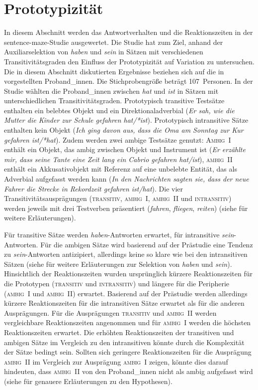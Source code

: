 \section{Prototypizität}
\label{ergprot}

In diesem Abschnitt werden das Antwortverhalten und die Reaktionszeiten in der sentence-maze-Studie ausgewertet. Die Studie hat zum Ziel, anhand der Auxiliarselektion von \textit{haben} und \textit{sein} in Sätzen mit verschiedenen Transitivitätsgraden den Einfluss der Prototypizität auf Varia\-tion zu untersuchen. Die in diesem Abschnitt diskutierten Ergebnisse beziehen sich auf die in  vorgestellten Proband\_innen. Die Stichprobengröße beträgt 107~Personen. In der Studie wählten die Proband\_innen zwischen \textit{hat} und \textit{ist} in Sätzen mit unterschiedlichen Transitivitätsgraden. Prototypisch transitive Testsätze enthalten ein belebtes Objekt und ein Direktionaladverbial (\textit{Er sah, wie die Mutter die Kinder zur Schule gefahren hat/*ist}). Prototypisch intransitive Sätze enthalten kein Objekt (\textit{Ich ging davon aus, dass die Oma am Sonntag zur Kur gefahren ist/*hat}). Zudem werden zwei ambige Testsätze genutzt: \textsc{Ambig~I} enthält ein Objekt, das ambig zwischen Objekt und Instrument ist (\textit{Er erzählte mir, dass seine Tante eine Zeit lang ein Cabrio gefahren hat/ist}), \textsc{ambig~II} enthält ein Akkusativobjekt mit Referenz auf eine unbelebte Entität, das als Adverbial aufgefasst werden kann (\textit{In den Nachrichten sagten sie, dass der neue Fahrer die Strecke in Rekordzeit gefahren ist/hat}). Die vier Transitivitätsausprägungen (\textsc{transitiv}, \textsc{ambig~I}, \textsc{ambig~II} und \textsc{intransitiv}) werden jeweils mit drei Testverben präsentiert (\textit{fahren}, \textit{fliegen}, \textit{reiten}) (siehe  für weitere Erläuterungen).

 
Für transitive Sätze werden \textit{haben}-Antworten erwartet, für intransitive \textit{sein}-Antworten. Für die ambigen Sätze wird basierend auf der Prästudie eine Tendenz zu \textit{sein}-Antworten antizipiert, allerdings keine so klare wie bei den intransitiven Sätzen (siehe  für weitere Erläuterungen zur Selektion von \textit{haben} und \textit{sein}). Hinsichtlich der Reaktionszeiten wurden ursprünglich kürzere Reaktionszeiten für die Prototypen (\textsc{transitiv} und \textsc{intransitiv}) und längere für die Peripherie (\textsc{ambig~I} und \textsc{ambig~II}) erwartet. Basierend auf der Prästudie werden allerdings kürzere Reaktionszeiten für die intransitiven Sätze erwartet als für die anderen Ausprägungen. Für die Ausprägungen \textsc{transitiv} und \textsc{ambig~II} werden vergleichbare Reaktionszeiten angenommen und für \textsc{ambig~I} werden die höchsten Reaktionszeiten erwartet. Die erhöhten Reaktionszeiten der transitiven und ambigen Sätze im Vergleich zu den intransitiven könnte durch die Komplexität der Sätze bedingt sein. Sollten sich  geringere Reaktionszeiten für die Ausprägung \textsc{ambig~II} im Vergleich zur Ausprägung \textsc{ambig~I} zeigen, könnte dies darauf hindeuten, dass \textsc{ambig~II} von den Proband\_innen nicht als ambig aufgefasst wird (siehe  für genauere Erläuterungen zu den Hypothesen).      


